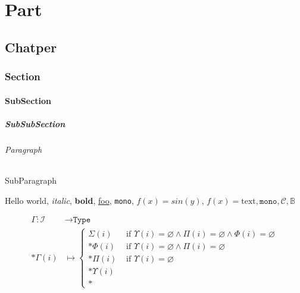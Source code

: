 \documentclass[11pt]{report}
\begin{document}
\part{Part}
\chapter{Chatper}
\section{Section}
\subsection{SubSection}
\subsubsection{SubSubSection}
\paragraph{Paragraph}
\subparagraph{SubParagraph}

Hello world, \textit{italic}, \textbf{bold}, \underline{foo}, \texttt{mono}, $f(x)=sin(y)$, $f(x) = \text{text}, \texttt{mono}, \mathcal{C}, \mathbb{B}$

\[
	\begin{split}
		\Gamma : \mathcal{I} & \to \texttt{Type}\\*
		\Gamma(i)            & \mapsto \begin{cases}
			\Sigma(i)    &\text{ if } \Upsilon(i)=\varnothing \land \Pi(i)=\varnothing \land \Phi(i)=\varnothing \\*
			\Phi(i)      &\text{ if } \Upsilon(i)=\varnothing \land \Pi(i)=\varnothing \\*
			\Pi(i)       &\text{ if } \Upsilon(i)=\varnothing \\*
			\Upsilon(i)  & \\*
		\end{cases}
	\end{split}
\]
\end{document}
